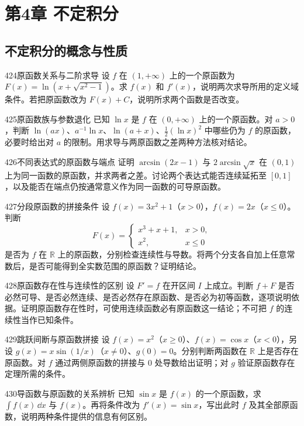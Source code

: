 \section{第4章 不定积分}
\subsection{不定积分的概念与性质}
\begin{exercise}{424}{原函数关系与二阶求导}
设 $f$ 在 $(1,+\infty)$ 上的一个原函数为 $F(x)=\ln(x+\sqrt{x^2-1})$。求 $f(x)$ 和 $f'(x)$，说明两次求导所用的定义域条件。若把原函数改为 $F(x)+C$，说明所求两个函数是否改变。
\end{exercise}
\begin{exercise}{425}{原函数族与参数退化}
已知 $\ln x$ 是 $f$ 在 $(0,+\infty)$ 上的一个原函数。对 $a>0$，判断 $\ln(ax)$、$a^{-1}\ln x$、$\ln(a+x)$、$\tfrac12(\ln x)^2$ 中哪些仍为 $f$ 的原函数，必要时给出对 $a$ 的限制。用求导与两原函数之差两种方法核对结论。
\end{exercise}
\begin{exercise}{426}{不同表达式的原函数与端点}
证明 $\arcsin(2x-1)$ 与 $2\arcsin\sqrt x$ 在 $(0,1)$ 上为同一函数的原函数，并求两者之差。讨论两个表达式能否连续延拓至 $[0,1]$，以及能否在端点仍按通常意义作为同一函数的可导原函数。
\end{exercise}
\begin{exercise}{427}{分段原函数的拼接条件}
设 $f(x)=3x^2+1$（$x>0$），$f(x)=2x$（$x\le0$）。判断
\[F(x)=\begin{cases}x^3+x+1,&x>0,\\x^2,&x\le0\end{cases}\]
是否为 $f$ 在 $\mathbb R$ 上的原函数，分别检查连续性与导数。将两个分支各自加上任意常数后，是否可能得到全实数范围的原函数？证明结论。
\end{exercise}
\begin{exercise}{428}{原函数存在性与连续性的区别}
设 $F'=f$ 在开区间 $I$ 上成立。判断 $f+F$ 是否必然可导、是否必然连续、是否必然存在原函数、是否必为初等函数，逐项说明依据。证明原函数存在性时，可使用连续函数必有原函数这一结论；不可把 $f$ 的连续性当作已知条件。
\end{exercise}
\begin{exercise}{429}{跳跃间断与原函数拼接}
设 $f(x)=x^2$（$x\ge0$）、$f(x)=\cos x$（$x<0$），另设 $g(x)=x\sin(1/x)$（$x\ne0$）、$g(0)=0$。分别判断两函数在 $\mathbb R$ 上是否存在原函数。对 $f$ 通过两侧原函数的拼接与 $0$ 处导数给出证明；对 $g$ 验证原函数存在定理所需的条件。
\end{exercise}
\begin{exercise}{430}{导函数与原函数的关系辨析}
已知 $\sin x$ 是 $f(x)$ 的一个原函数，求 $\int f(x)\,\dd x$ 与 $f(x)$。再将条件改为 $f'(x)=\sin x$，写出此时 $f$ 及其全部原函数，说明两种条件提供的信息有何区别。
\end{exercise}
